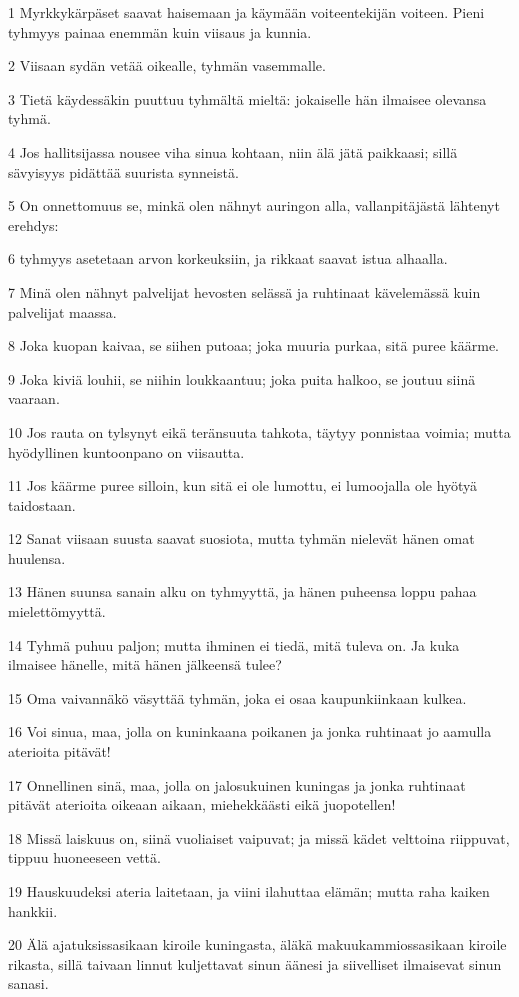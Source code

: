 \par 1 Myrkkykärpäset saavat haisemaan ja käymään voiteentekijän voiteen. Pieni tyhmyys painaa enemmän kuin viisaus ja kunnia.
\par 2 Viisaan sydän vetää oikealle, tyhmän vasemmalle.
\par 3 Tietä käydessäkin puuttuu tyhmältä mieltä: jokaiselle hän ilmaisee olevansa tyhmä.
\par 4 Jos hallitsijassa nousee viha sinua kohtaan, niin älä jätä paikkaasi; sillä sävyisyys pidättää suurista synneistä.
\par 5 On onnettomuus se, minkä olen nähnyt auringon alla, vallanpitäjästä lähtenyt erehdys:
\par 6 tyhmyys asetetaan arvon korkeuksiin, ja rikkaat saavat istua alhaalla.
\par 7 Minä olen nähnyt palvelijat hevosten selässä ja ruhtinaat kävelemässä kuin palvelijat maassa.
\par 8 Joka kuopan kaivaa, se siihen putoaa; joka muuria purkaa, sitä puree käärme.
\par 9 Joka kiviä louhii, se niihin loukkaantuu; joka puita halkoo, se joutuu siinä vaaraan.
\par 10 Jos rauta on tylsynyt eikä teränsuuta tahkota, täytyy ponnistaa voimia; mutta hyödyllinen kuntoonpano on viisautta.
\par 11 Jos käärme puree silloin, kun sitä ei ole lumottu, ei lumoojalla ole hyötyä taidostaan.
\par 12 Sanat viisaan suusta saavat suosiota, mutta tyhmän nielevät hänen omat huulensa.
\par 13 Hänen suunsa sanain alku on tyhmyyttä, ja hänen puheensa loppu pahaa mielettömyyttä.
\par 14 Tyhmä puhuu paljon; mutta ihminen ei tiedä, mitä tuleva on. Ja kuka ilmaisee hänelle, mitä hänen jälkeensä tulee?
\par 15 Oma vaivannäkö väsyttää tyhmän, joka ei osaa kaupunkiinkaan kulkea.
\par 16 Voi sinua, maa, jolla on kuninkaana poikanen ja jonka ruhtinaat jo aamulla aterioita pitävät!
\par 17 Onnellinen sinä, maa, jolla on jalosukuinen kuningas ja jonka ruhtinaat pitävät aterioita oikeaan aikaan, miehekkäästi eikä juopotellen!
\par 18 Missä laiskuus on, siinä vuoliaiset vaipuvat; ja missä kädet velttoina riippuvat, tippuu huoneeseen vettä.
\par 19 Hauskuudeksi ateria laitetaan, ja viini ilahuttaa elämän; mutta raha kaiken hankkii.
\par 20 Älä ajatuksissasikaan kiroile kuningasta, äläkä makuukammiossasikaan kiroile rikasta, sillä taivaan linnut kuljettavat sinun äänesi ja siivelliset ilmaisevat sinun sanasi.

